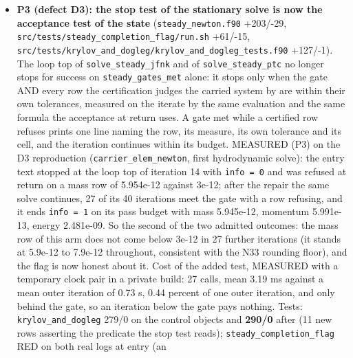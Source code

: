 \documentclass[english,a4paper]{my_memo}
\begin{document}
\begin{itemize}
  byte-identical and \texttt{Hydro\_ioniz.txt} identical but the provenance
  timestamp, which is the expected result because the marching loop calls
  \texttt{photochemical\_transport\_step} directly and never this routine. The cost is
  stated: a bounded pass advances less, so the frozen H2 residual after the
  composition update is larger (4.4708e-01 at trust 0.01 against the entry
  text\textquotesingle s 3.1897e-01, from 4.9275e-01 before), and the state handed on is
  correspondingly closer to the entry state.
\item
  \textbf{P3 (defect D3): the stop test of the stationary solve is now the
  acceptance test of the state} (\texttt{steady\_newton.f90} +203/-29,
  \texttt{src/tests/steady\_completion\_flag/run.sh} +61/-15,
  \texttt{src/tests/krylov\_and\_dogleg/krylov\_and\_dogleg\_tests.f90} +127/-1). The loop
  top of \texttt{solve\_steady\_jfnk} and of \texttt{solve\_steady\_ptc} no longer stops for
  success on \texttt{steady\_gates\_met} alone: it stops only when the gate AND every
  row the certification judges the carried system by are within their own
  tolerances, measured on the iterate by the same evaluation and the same
  formula the acceptance at return uses. A gate met while a certified row
  refuses prints one line naming the row, its measure, its own tolerance and
  its cell, and the iteration continues within its budget. MEASURED (P3) on
  the D3 reproduction (\texttt{carrier\_elem\_newton}, first hydrodynamic solve): the
  entry text stopped at the loop top of iteration 14 with \texttt{info\ =\ 0} and was
  refused at return on a mass row of 5.954e-12 against 3e-12; after the
  repair the same solve continues, 27 of its 40 iterations meet the gate with
  a row refusing, and it ends \texttt{info\ =\ 1} on its pass budget with mass
  5.945e-12, momentum 5.991e-13, energy 2.481e-09. So the second of the two
  admitted outcomes: the mass row of this arm does not come below 3e-12 in 27
  further iterations (it stands at 5.9e-12 to 7.9e-12 throughout, consistent
  with the N33 rounding floor), and the flag is now honest about it. Cost of
  the added test, MEASURED with a temporary clock pair in a private build: 27
  calls, mean 3.19 ms against a mean outer iteration of 0.73 s, 0.44 percent
  of one outer iteration, and only behind the gate, so an iteration below the
  gate pays nothing. Tests: \texttt{krylov\_and\_dogleg} 279/0 on the control objects
  and \textbf{290/0} after (11 new rows asserting the predicate the stop test
  reads); \texttt{steady\_completion\_flag} RED on both real logs at entry (an

\end{itemize}
\end{document}
